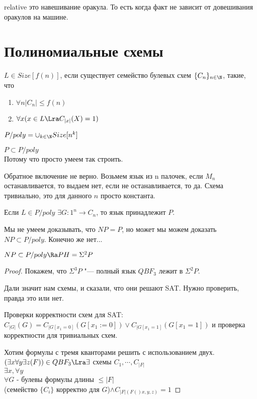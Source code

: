 relative это навешивание оракула. То есть когда факт не зависит от довешивания оракулов на машине. 

\section{Полиномиальные схемы}
\begin{Def}
$L \in Size[f(n)]$, если существует семейство булевых схем $\{C_n\}_{n \in \N}$, такие, что 
\begin{enumerate}
\item $\forall n |C_n| \le f(n)$\\
\item $\forall x(x \in L \Lra C_{|x|}(X) = 1)$
\end{enumerate}
\end{Def}
\begin{Def}
$P/poly = \cup_{k \in \N}Size[n^k]$
\end{Def}
$P \subset P/poly$\\
Потому что просто умеем так строить. 

Обратное включение не верно. Возьмем язык из n палочек, если $M_n$ останавливается, 
то выдаем нет, если не останавливается, то да. Схема тривиально, это для данного $n$ 
просто константа. 

Если $L \in P/poly$
$\exists G \colon 1^n \to C_n$, то язык принадлежит $P$.

Мы не умеем доказывать, что $NP = P$, но может
мы можем доказать $NP \subset P/poly$. Конечно же нет...

\begin{theorem}
$NP \subset P/poly \Ra PH = \Sigma^2P$\\
\end{theorem}
\begin{proof}
Покажем, что $\Sigma^3P$ "--- полный язык $QBF_3$ лежит 
в $\Sigma^2P$.

Дали значит нам схемы, и сказали, что они решают SAT. Нужно проверить, 
правда это или нет. 

Проверки корректности схем для SAT:
$C_{|G|}(G) = C_{|G[x_1 = 0]}(G[x_1:= 0]) \vee C_{|G[x_1 = 1]}(G[x_1 = 1])$
и проверка корректности для тривиальных схем.

Хотим формулы с тремя кванторами решить с использованием двух.
$(\exists x\forall y \exists z(F)) \in QBF_3 \Lra\\
\exists$ схемы $C_1, \cdots, C_{|F|}$\\
$\exists x, \forall y$\\
$\forall G$ - булевы формулы длины $\le |F|$\\
(семейство $\{C_i\}$ корректно для $G$)$\wedge C_{|F|(F()x,y, z)} = 1$  
\end{proof}

